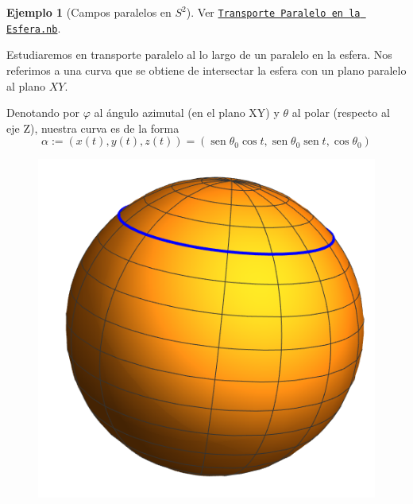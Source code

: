 \documentclass[spanish]{book}
\theoremstyle{definition}
\newtheorem*{ejem}{Ejemplo}
\DeclareMathOperator{\sen}{sen}
\begin{document}
	\begin{ejem}[Campos paralelos en $S^2$]
		
		
		Ver \href{https://github.com/danimalabares/geo-riem/blob/main/Transporte%20Paralelo%20en%20la%20Esfera.nb}{\texttt{Transporte Paralelo en la Esfera.nb}}.
		
		Estudiaremos en transporte paralelo al lo largo de un paralelo en la esfera. Nos referimos a una curva que se obtiene de intersectar la esfera con un plano paralelo al plano $XY$.
		
		Denotando por $\varphi$ al ángulo azimutal (en el plano XY) y $\theta$ al polar (respecto al eje Z), nuestra curva es de la forma
		\[\alpha:=(x(t),y(t),z(t))=(\sen\theta_0\cos t,\sen\theta_0\sen t,\cos\theta_0)\]
		\begin{figure}[H]
			\centering
			\includegraphics[width=0.4\linewidth]{fig14}
			\label{fig:fig14}
		\end{figure}
		

\end{ejem}
\end{document}
